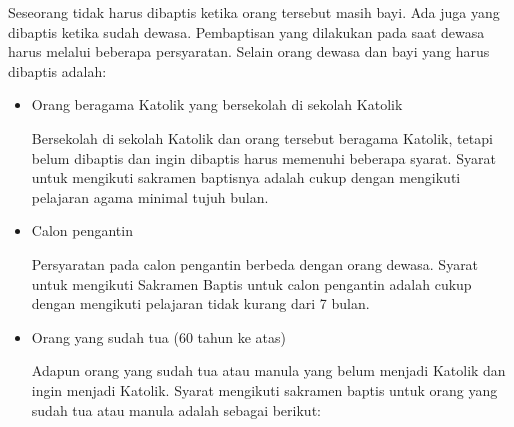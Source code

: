 \documentclass[a4paper,twoside]{article}
\begin{document}
\begin{enumerate}
	Seseorang tidak harus dibaptis ketika orang tersebut masih bayi. Ada juga yang dibaptis ketika sudah dewasa. Pembaptisan yang dilakukan pada saat dewasa harus melalui beberapa persyaratan. Selain orang dewasa dan bayi yang harus dibaptis adalah:
	
	\begin{itemize}
		
	
		
		\item Orang beragama Katolik yang bersekolah di sekolah Katolik
		
		Bersekolah di sekolah Katolik dan orang tersebut beragama Katolik, tetapi belum dibaptis dan ingin dibaptis harus memenuhi beberapa syarat. Syarat untuk mengikuti sakramen baptisnya adalah cukup dengan mengikuti pelajaran agama minimal tujuh bulan.
		
		\item Calon pengantin
		
		Persyaratan pada calon pengantin berbeda dengan orang dewasa. Syarat untuk mengikuti Sakramen Baptis untuk calon pengantin adalah cukup dengan mengikuti pelajaran tidak kurang dari 7 bulan.
		\item Orang yang sudah tua (60 tahun ke atas)
		
		Adapun orang yang sudah tua atau manula yang belum menjadi Katolik dan ingin menjadi Katolik. Syarat mengikuti sakramen baptis untuk orang yang sudah tua atau manula adalah sebagai berikut:
		

\end{itemize}
\end{enumerate}
\end{document}
